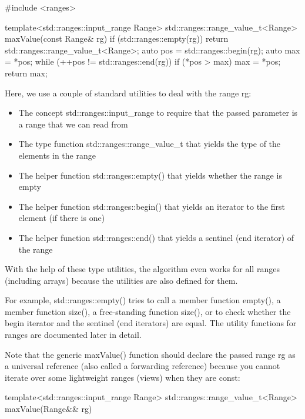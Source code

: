 \begin{cpp}
#include <ranges>

template<std::ranges::input_range Range>
std::ranges::range_value_t<Range> maxValue(const Range& rg)
{
	if (std::ranges::empty(rg)) {
		return std::ranges::range_value_t<Range>{};
	}
	auto pos = std::ranges::begin(rg);
	auto max = *pos;
	while (++pos != std::ranges::end(rg)) {
		if (*pos > max) {
			max = *pos;
		}
	}
	return max;
}
\end{cpp}

Here, we use a couple of standard utilities to deal with the range rg:

\begin{itemize}
\item
The concept std::ranges::input\_range to require that the passed parameter is a range that we can read from

\item
The type function std::ranges::range\_value\_t that yields the type of the elements in the range

\item
The helper function std::ranges::empty() that yields whether the range is empty

\item
The helper function std::ranges::begin() that yields an iterator to the first element (if there is one)

\item
The helper function std::ranges::end() that yields a sentinel (end iterator) of the range
\end{itemize}

With the help of these type utilities, the algorithm even works for all ranges (including arrays) because the utilities are also defined for them.

For example, std::ranges::empty() tries to call a member function empty(), a member function size(), a free-standing function size(), or to check whether the begin iterator and the sentinel (end iterators) are equal. The utility functions for ranges are documented later in detail.

Note that the generic maxValue() function should declare the passed range rg as a universal reference (also called a forwarding reference) because you cannot iterate over some lightweight ranges (views) when they are const:

\begin{cpp}
template<std::ranges::input_range Range>
std::ranges::range_value_t<Range> maxValue(Range&& rg)
\end{cpp}

